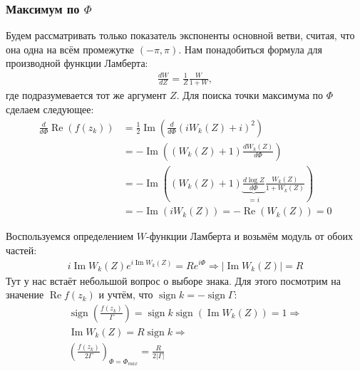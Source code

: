 \documentclass[a4paper, 12pt]{article}
\DeclareMathOperator*{\sign}{sign}
\DeclareMathOperator*{\Real}{Re}
\DeclareMathOperator*{\Imag}{Im}
\begin{document}
\subsubsection*{Максимум по $\Phi$}
Будем рассматривать только показатель экспоненты основной ветви, считая, что она одна на всём промежутке $(-\pi, \pi)$.
Нам понадобиться формула для производной функции Ламберта:
\begin{equation}
\begin{aligned}
    \frac{dW}{dZ} = \frac{1}{Z}\frac{W}{1+W},
\end{aligned}
\end{equation}
где подразумевается тот же аргумент $Z$.
Для поиска точки максимума по $\Phi$ сделаем следующее:
\begin{equation}
\begin{aligned}
    \frac{d}{d\Phi}\Real\left(f(z_k)\right) &= 
    \frac{1}{2}\Imag\left(\frac{d}{d\Phi} (iW_k(Z) + i)^2\right) \\
    &= -\Imag\left((W_k(Z) + 1)\frac{dW_k(Z)}{d\Phi}\right)\\
    &= -\Imag\left((W_k(Z) + 1) \underbrace{\frac{d\log Z}{d\Phi}}_{=i} \frac{W_k(Z)}{1+W_k(Z)} \right)\\
    &= -\Imag\left(i W_k(Z)\right) = -\Real(W_k(Z)) = 0
\end{aligned}
\end{equation}

Воспользуемся определением $W$-функции Ламберта и возьмём модуль от обоих частей:
\begin{equation}
\begin{aligned}
    i\Imag W_k(Z)e^{i\Imag W_k(Z)} = R e^{i\Phi} \Rightarrow \left|\Imag W_k(Z)\right| = R
\end{aligned}
\end{equation}
Тут у нас встаёт небольшой вопрос о выборе знака. Для этого посмотрим на значение $\Real f(z_k)$ и учтём, что $\sign k = -\sign \Gamma$:
\begin{equation}
\begin{aligned}
    \sign\left(\frac{f(z_k)}{\Gamma}\right) = \sign k \sign\left(\Imag W_k(Z)\right) = 1 \Rightarrow \\\Imag W_k(Z) = R\sign k \Rightarrow \\
    \left(\frac{f(z_k)}{2\Gamma}\right)_{\Phi = \Phi_{max}} = \frac{R}{2|\Gamma|}
\end{aligned}
\end{equation}
\end{document}
